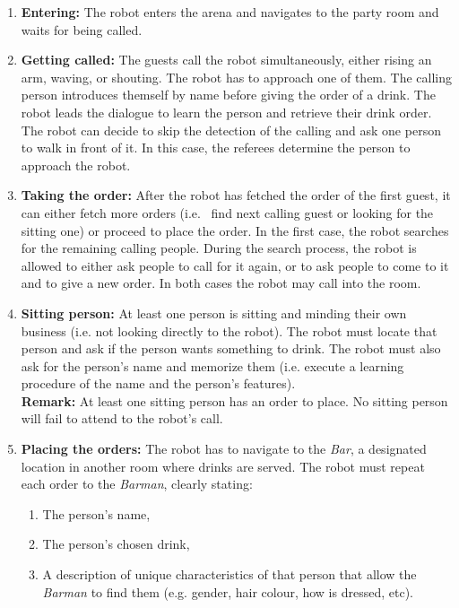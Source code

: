 \begin{enumerate}

	\item \textbf{Entering:} The robot enters the arena and navigates to the party room and waits for being called.

	\item \textbf{Getting called:} The guests call the robot simultaneously, either rising an arm, waving, or shouting. The robot has to approach one of them.
	The calling person introduces themself by name before giving the order of a drink. The robot leads the dialogue to learn the person and retrieve their drink order. \\

	The robot can decide to skip the detection of the calling and ask one person to walk in front of it. In this case, the referees determine the person to approach the robot.

	\item \textbf{Taking the order:} After the robot has fetched the order of the first guest, it can either fetch more orders (i.e.~ find next calling guest or looking for the sitting one) or proceed to place the order. In the first case, the robot searches for the remaining calling people. During the search process, the robot is allowed to either ask people to call for it again, or to ask people to come to it and to give a new order. In both cases the robot may call into the room.

	\item \textbf{Sitting person:} At least one person is sitting and minding their own business (i.e. not looking directly to the robot). The robot must locate that person and ask if the person wants something to drink. The robot must also ask for the person's name and memorize them (i.e. execute a learning procedure of the name and the person's features). \\

	\textbf{Remark:} At least one sitting person has an order to place. No sitting person will fail to attend to the robot's call.

	\item \textbf{Placing the orders:} The robot has to navigate to the \textit{Bar}, a designated location in another room where drinks are served. The robot must repeat each order to the \textit{Barman}, clearly stating:
	\begin{enumerate}
		\item The person's name,
		\item The person's chosen drink,
		\item A description of unique characteristics of that person that allow the \textit{Barman} to find them (e.g. gender, hair colour, how is dressed, etc).
	\end{enumerate}


\end{enumerate}
